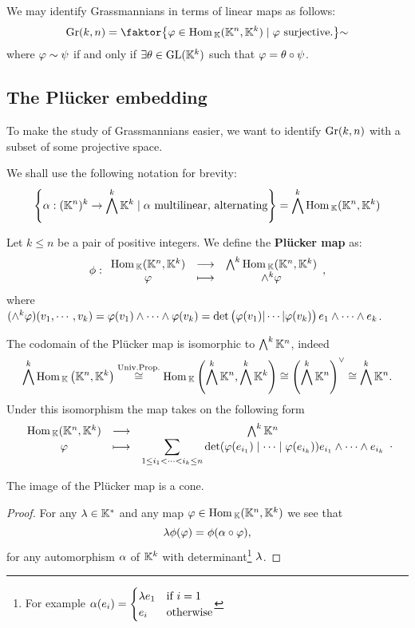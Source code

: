 \begin{corollary}\label{LinearQuotientDefinition}
We may identify Grassmannians in terms of linear maps as follows:
\[\Gr(k,n)=\quot{\cpa{\vp\in \Hom_\K(\K^n,\K^k)\mid \vp\ \text{surjective.}}}\sim\]
where $\varphi\sim \psi$ if and only if $\exists \theta\in \mathrm{GL}(\mathbb{K}^k)$ such that $\varphi=\theta\circ \psi$.
\end{corollary}

\subsection{The Pl\"ucker embedding}
To make the study of Grassmannians easier, we want to identify $\mathrm{Gr}(k,n)$ with a subset of some projective space.

\begin{notation}
We shall use the following notation for brevity:
\[\left\{{\alpha:(\mathbb{K}^n)^k\to \bigwedge^k\mathbb{K}^k\mid \alpha\text{ multilinear, alternating}}\right\}=\bigwedge^k\mathrm{Hom}\,_{\mathbb{K}}(\mathbb{K}^n,\mathbb{K}^k)\]
\end{notation}

\begin{definition}
Let $k\leq n$ be a pair of positive integers. We define the \textbf{Pl\"ucker map} as:
\[\phi:\begin{array}{ccc} {\mathrm{Hom}\,_{\mathbb{K}}(\mathbb{K}^n,\mathbb{K}^k)} & \longrightarrow & {\bigwedge^k\mathrm{Hom}\,_{\mathbb{K}}(\mathbb{K}^n,\mathbb{K}^k)}\\ {\varphi} & \longmapsto & {\wedge^k\varphi} \end{array},\]
where $(\wedge^k\varphi)(v_1,\cdots, v_k)=\varphi(v_1)\wedge\cdots\wedge\varphi(v_k)=\det\begin{pmatrix}\varphi(v_1)|\cdots|\varphi(v_k)\end{pmatrix} e_1\wedge\cdots\wedge e_k$.
\end{definition}

\begin{remark}\label{CodomainOfPluckerMap}
The codomain of the Pl\"ucker map is isomorphic to $\bigwedge^k\mathbb{K}^n$, indeed
\[\bigwedge^k\mathrm{Hom}\,_{\mathbb{K}}\left({\mathbb{K}^n,\mathbb{K}^k}\right)\overset{\text{Univ.Prop.}}{\cong}\mathrm{Hom}\,_{\mathbb{K}}\left({\bigwedge^k\mathbb{K}^n,\bigwedge^k\mathbb{K}^k}\right)\cong \left({\bigwedge^k\mathbb{K}^n}\right)^{\vee}\cong \bigwedge^k\mathbb{K}^n.\]
Under this isomorphism the map takes on the following form
\[\begin{array}{ccc} {\mathrm{Hom}\,_{\mathbb{K}}(\mathbb{K}^n,\mathbb{K}^k)} & \longrightarrow & {\bigwedge^k\mathbb{K}^n}\\ {\varphi} & \longmapsto & {\displaystyle\sum_{1\leq i_1<\cdots< i_k\leq n} \det(\varphi(e_{i_1})\mid \cdots\mid \varphi(e_{i_k}))e_{i_1}\wedge\cdots\wedge e_{i_k}} \end{array}.\]
\end{remark}


\begin{remark}
The image of the Pl\"ucker map is a cone.
\end{remark}
\begin{proof}
For any $\lambda\in \mathbb{K}^\ast$ and any map $\varphi\in \mathrm{Hom}\,_{\mathbb{K}}(\mathbb{K}^n,\mathbb{K}^k)$ we see that
\[\lambda\phi(\varphi)=\phi(\alpha\circ \varphi),\]
for any automorphism $\alpha$ of $\mathbb{K}^k$ with determinant\footnote{For example $\alpha(e_i)=\begin{cases}
\lambda e_1 &\text{if }i=1\\
e_i &\text{otherwise}
\end{cases}$} $\lambda$.
\end{proof}



